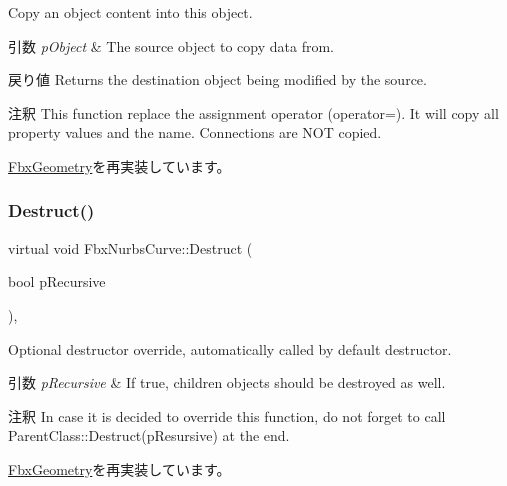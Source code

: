 Copy an object content into this object. 
\begin{DoxyParams}{引数}
{\em p\+Object} & The source object to copy data from. \\
\hline
\end{DoxyParams}
\begin{DoxyReturn}{戻り値}
Returns the destination object being modified by the source. 
\end{DoxyReturn}
\begin{DoxyRemark}{注釈}
This function replace the assignment operator (operator=). It will copy all property values and the name. Connections are N\+OT copied. 
\end{DoxyRemark}


\hyperlink{class_fbx_geometry_aac1cee4251e3d5fbd27f1181c58b83b3}{Fbx\+Geometry}を再実装しています。

\mbox{\label{class_fbx_nurbs_curve_a8c562cccf434c37cb3aad0df27d60e86}} 
\subsubsection{\texorpdfstring{Destruct()}{Destruct()}}
{\footnotesize\ttfamily virtual void Fbx\+Nurbs\+Curve\+::\+Destruct (\begin{DoxyParamCaption}\item[{bool}]{p\+Recursive }\end{DoxyParamCaption})\hspace{0.3cm}{\ttfamily [protected]}, {\ttfamily [virtual]}}

Optional destructor override, automatically called by default destructor. 
\begin{DoxyParams}{引数}
{\em p\+Recursive} & If true, children objects should be destroyed as well. \\
\hline
\end{DoxyParams}
\begin{DoxyRemark}{注釈}
In case it is decided to override this function, do not forget to call Parent\+Class\+::\+Destruct(p\+Resursive) at the end. 
\end{DoxyRemark}


\hyperlink{class_fbx_geometry_a07e94f7801067d66429afbf1799795cd}{Fbx\+Geometry}を再実装しています。

\mbox{\label{class_fbx_nurbs_curve_ac7a9cb28093611aecedf032a73e76969}} 
